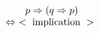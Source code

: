 \documentclass[12pt,a4paper]{article}
\makeatletter
\newenvironment{EquivProof}{\[ \begin{array}{@{}l}}{ \end{array}\]}
\newcommand{\proofline}[1]{~~~~~~#1}
\newcommand{\equivto}[1]{\Leftrightarrow~<~\mbox{#1}~>}
\makeatother
\begin{document}
	
\begin{EquivProof}
	\proofline{p \Rightarrow ( q \Rightarrow p )}\\ 
	\equivto{implication}\\
\end{EquivProof}
	
\end{document}
